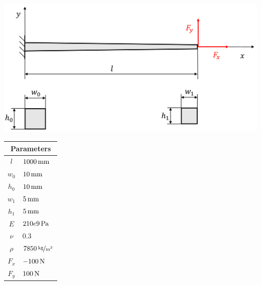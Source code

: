 \begin{minipage}{\textwidth}
	\begin{minipage}[b]{0.7\textwidth}
		\centering
		\includegraphics[width=\textwidth]{figures/verification/reference-beam-2}
	\end{minipage}
	\hfill
	\begin{minipage}[b]{0.29\textwidth}
		\centering
		\begin{tabular}{|cl|}
			\hline
			\multicolumn{2}{|c|}{Parameters} \\
			\hline
			$l$ & $\unit[1000]{mm}$ \\
			$w_0$ & $\unit[10]{mm}$ \\
			$h_0$ & $\unit[10]{mm}$ \\
			$w_1$ & $\unit[5]{mm}$ \\
			$h_1$ & $\unit[5]{mm}$ \\
			$E$ & $\unit[210e9]{Pa}$ \\
			$\nu$ & $0.3$ \\
			$\rho$ & $\unitfrac[7850]{kg}{m^3}$ \\
			$F_x$ & $\unit[-100]{N}$ \\
			$F_y$ & $\unit[100]{N}$ \\
			\hline
		\end{tabular}
	\end{minipage}
\end{minipage}

